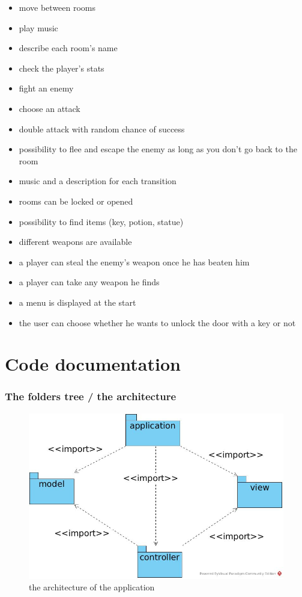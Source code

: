 \documentclass[11pt]{extarticle}
\begin{document}
\begin{itemize}
    \item move between rooms
    \item play music
    \item describe each room's name
    \item check the player's stats
    \item fight an enemy 
    \item choose an attack
    \item double attack with random chance of success
    \item possibility to flee and escape the enemy as long as you don't go back to the room
    \item music and a description for each transition
    \item rooms can be locked or opened
    \item possibility to find items (key, potion, statue)
    \item different weapons are available
    \item a player can steal the enemy's weapon once he has beaten him
    \item a player can take any weapon he finds
    \item a menu is displayed at the start
    \item the user can choose whether he wants to unlock the door with a key or not
\end{itemize}

\clearpage

\part{Code documentation}

\setcounter{section}{0}

\section{The folders tree / the architecture}

\begin{figure}[ht]
    \centering
    
    \caption{the architecture of the application}
    \label{architecture}
    \includegraphics[scale = 0.4]{architecture}
\end{figure}
\end{document}
